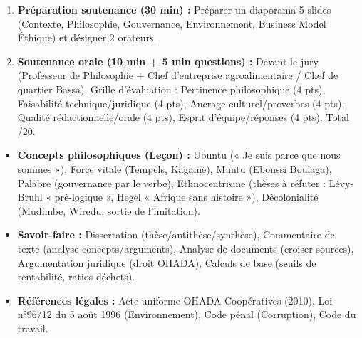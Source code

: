\documentclass[11pt]{article}
\newcommand{\cle}[1]{{\popxbold\color{popdark}#1}}
\newcounter{popsec}
\newcounter{popsub}
\newcommand{\courssub}[1]{%
  \stepcounter{popsub}%
  \par\vspace{9pt}\noindent{\popxbold\fontsize{11.5}{13}\selectfont\color{popink}{\color{poporange}\thepopsec.\thepopsub}\hspace{6pt}#1}\par\nopagebreak\vspace{4pt}
}
\begin{document}
\begin{enumerate}
\begin{itemize}
\begin{itemize}
        \end{itemize}
        \item \textbf{Titre III : Éthique de l'Ingénieur \& Lutte Anti-Corruption (Clause unique, Art 9) :} Refus pots-de-vin fournisseurs/acheteurs ; déclaration d'intérêts ; clause de non-concurrence loyale ; sanction : exclusion + poursuite pénale (Code pénal camerounais, Art 134 ss).
    \end{itemize}
    \item \textbf{Préparation soutenance (30 min) :} Préparer un diaporama 5 slides (Contexte, Philosophie, Gouvernance, Environnement, Business Model Éthique) et désigner 2 orateurs.
    \item \textbf{Soutenance orale (10 min + 5 min questions) :} Devant le jury (Professeur de Philosophie + Chef d'entreprise agroalimentaire / Chef de quartier Bassa). Grille d'évaluation : Pertinence philosophique (4 pts), Faisabilité technique/juridique (4 pts), Ancrage culturel/proverbes (4 pts), Qualité rédactionnelle/orale (4 pts), Esprit d'équipe/réponses (4 pts). Total /20.
\end{enumerate}

\courssub{Ressources à mobiliser}
\begin{itemize}
    \item \textbf{Concepts philosophiques (Leçon) :} \cle{Ubuntu} (« Je suis parce que nous sommes »), \cle{Force vitale} (Tempels, Kagamé), \cle{Muntu} (Eboussi Boulaga), \cle{Palabre} (gouvernance par le verbe), \cle{Ethnocentrisme} (thèses à réfuter : Lévy-Bruhl « pré-logique », Hegel « Afrique sans histoire »), \cle{Décolonialité} (Mudimbe, Wiredu, sortie de l'imitation).
    \item \textbf{Savoir-faire :} Dissertation (thèse/antithèse/synthèse), Commentaire de texte (analyse concepts/arguments), Analyse de documents (croiser sources), Argumentation juridique (droit OHADA), Calculs de base (seuils de rentabilité, ratios déchets).
    \item \textbf{Références légales :} Acte uniforme OHADA Coopératives (2010), Loi n°96/12 du 5 août 1996 (Environnement), Code pénal (Corruption), Code du travail.
\end{itemize}
\end{document}
